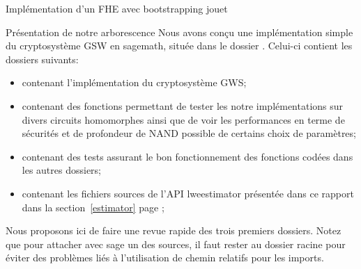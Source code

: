 \begin{section}{Implémentation d'un FHE avec bootstrapping \og{}jouet\fg~{}}
\begin{subsection}{Présentation de notre arborescence}
Nous avons conçu une implémentation simple du cryptosystème GSW en sagemath, située dans le dossier
. Celui-ci contient les  dossiers suivants:
\begin{itemize}
\item {} contenant l'implémentation du cryptosystème GWS;
\item {} contenant des fonctions permettant 
	de tester les notre implémentations sur divers circuits homomorphes ainsi que de voir les performances en terme
	de sécurités et de profondeur de NAND possible de certains choix de paramètres;
\item {} contenant des tests assurant le bon fonctionnement
	des fonctions codées dans les autres dossiers; 
\item {} contenant les fichiers sources de l'API
	 lwe\textunderscore estimator présentée dans ce rapport dans la section~\ref{estimator} page \pageref{estimator}; 
\end{itemize}

Nous proposons ici de faire une revue rapide des trois premiers dossiers. Notez que pour
attacher avec sage un des sources, il faut rester au dossier racine pour
éviter des problèmes liés à l'utilisation de chemin relatifs pour les imports.



\end{subsection}
\end{section}
